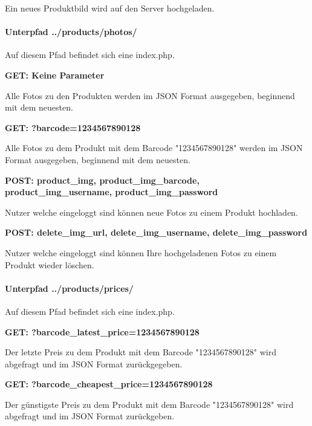 \documentclass{scrartcl}
\begin{document}
\noindent Ein neues Produktbild wird auf den Server hochgeladen.

\newpage

\paragraph{Unterpfad ../products/photos/}
Auf diesem Pfad befindet sich eine index.php. \newline 

\noindent \textbf{GET: Keine Parameter}

\noindent Alle Fotos zu den Produkten werden im JSON Format ausgegeben, beginnend mit dem neuesten. \newline 

\noindent \textbf{GET: ?barcode=1234567890128}

\noindent Alle Fotos zu dem Produkt mit dem Barcode "1234567890128" werden im JSON Format ausgegeben, beginnend mit dem neuesten. \newline 

\noindent \textbf{POST: product\_img, product\_img\_barcode, \newline product\_img\_username, product\_img\_password}

\noindent Nutzer welche eingeloggt sind können neue Fotos zu einem Produkt hochladen. \newline

\noindent \textbf{POST: delete\_img\_url, delete\_img\_username, delete\_img\_password}

\noindent Nutzer welche eingeloggt sind können Ihre hochgeladenen Fotos zu einem Produkt wieder löschen.

\paragraph{Unterpfad ../products/prices/}

Auf diesem Pfad befindet sich eine index.php. \newline 

\noindent \textbf{GET: ?barcode\_latest\_price=1234567890128}

\noindent Der letzte Preis zu dem Produkt mit dem Barcode "1234567890128" wird abgefragt und im JSON Format zurückgegeben. \newline 

\noindent \textbf{GET: ?barcode\_cheapest\_price=1234567890128}

\noindent Der günstigste Preis zu dem Produkt mit dem Barcode "1234567890128" wird abgefragt und im JSON Format zurückgeben. \newline 
\end{document}
